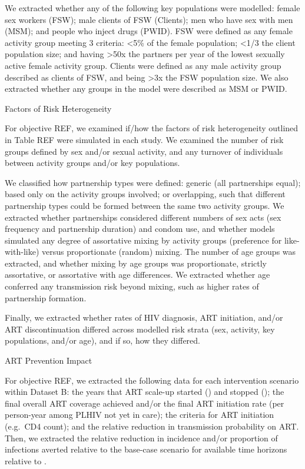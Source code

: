 We extracted whether any of the following key populations were modelled:
female sex workers (FSW);
male clients of FSW (Clients);
men who have sex with men (MSM); and
people who inject drugs (PWID).
FSW were defined as any female activity group meeting 3 criteria:
{<5\%} of the female population;
{<1/3} the client population size; and
having {>50x} the partners per year of
the lowest sexually active female activity group.
Clients were defined as any male activity group
described as clients of FSW, and being {>3x} the FSW population size.
We also extracted whether any groups in the model were described as MSM or PWID.

Factors of Risk Heterogeneity

For objective REF, we examined if/how
the factors of risk heterogeneity outlined in Table REF
were simulated in each study.
We examined the number of risk groups defined by sex and/or sexual activity, and
any turnover of individuals between activity groups and/or key populations.

We classified how partnership types were defined:
generic (all partnerships equal);
based only on the activity groups involved;
or overlapping, such that different partnership types could be formed between the same two activity groups.
We extracted whether partnerships considered different
numbers of sex acts (sex frequency and partnership duration) and condom use,
and whether models simulated any degree of assortative mixing by activity groups
(preference for like-with-like) versus proportionate (random) mixing.
The number of age groups was extracted, and whether mixing by age groups was
proportionate, strictly assortative, or assortative with age differences.
We extracted whether age conferred any transmission risk beyond mixing,
such as higher rates of partnership formation.

Finally, we extracted whether rates of HIV diagnosis, ART initiation, and/or ART discontinuation
differed across modelled risk strata (sex, activity, key populations, and/or age),
and if so, how they differed.

ART Prevention Impact

For objective REF, we extracted
the following data for each intervention scenario within Dataset B:
the years that ART scale-up started () and stopped ();
the final overall ART coverage achieved and/or
the final ART initiation rate (per person-year among PLHIV not yet in care);
the criteria for ART initiation (e.g.\ CD4 count); and
the relative reduction in transmission probability on ART.
Then, we extracted the
relative reduction in incidence and/or proportion of infections averted
relative to the base-case scenario for available time horizons relative to .

